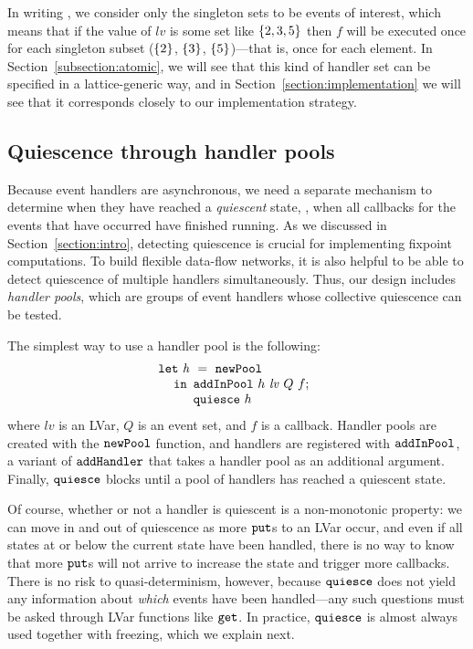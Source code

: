 In writing , we consider only the singleton sets to be events
of interest, which means that if the value of $\mathit{lv}$ is some set like
$\left\{2, 3, 5\right\}$ then $f$ will be executed once for each singleton subset
($\left\{2\right\}$, $\left\{3\right\}$, $\left\{5\right\}$)---that is, once for each element.  In
Section~\ref{subsection:atomic}, we will see that this kind of handler set can be specified in a
lattice-generic way, and in Section~\ref{section:implementation} we will see
that it corresponds closely to our implementation strategy.  


\subsection{Quiescence through handler pools}
\label{sec:quiescence-informal}

Because event handlers are asynchronous, we need a separate mechanism to
determine when they have reached a \emph{quiescent} state, \ie, when all
callbacks for the events that have occurred have finished running.  As we
discussed in Section~\ref{section:intro}, detecting quiescence is crucial for implementing
fixpoint computations.  To build flexible data-flow networks, it is also helpful
to be able to detect quiescence of multiple handlers simultaneously.  Thus, our
design includes \emph{handler pools}, which are groups of event handlers whose
collective quiescence can be tested.

The simplest way to use a handler pool is the following:
\[
\begin{array}[t]{l}
\mbox{\texttt{let}}~\mathit{h}~=~{\mbox{\texttt{newPool}}} \\
\hspace{1.2em} \mbox{\texttt{in}}
  \begin{array}[t]{l}
    {\mbox{\texttt{addInPool}}}~h~\mathit{lv}~Q~f; \\
    {\mbox{\texttt{quiesce}}}~h
  \end{array}
\end{array}
\]
where $\mathit{lv}$ is an LVar, $Q$ is an event set, and $f$ is a callback.
Handler pools are created with the ${\mbox{\texttt{newPool}}}$ function, and handlers are
registered with ${\mbox{\texttt{addInPool}}}$, a variant of ${\mbox{\texttt{addHandler}}}$ that takes a
handler pool as an additional argument.  Finally, ${\mbox{\texttt{quiesce}}}$ blocks until a pool
of handlers has reached a quiescent state.  

Of course, whether or not a handler is quiescent is a non-monotonic property: we
can move in and out of quiescence as more $\mbox{\texttt{put}}$s to an LVar occur, and even if
all states at or below the current state have been handled, there is no way to
know that more $\mbox{\texttt{put}}$s will not arrive to increase the state and trigger more
callbacks.  There is no risk to quasi-determinism, however, because ${\mbox{\texttt{quiesce}}}$
does not yield any information about \emph{which} events have been handled---any
such questions must be asked through LVar functions like $\mbox{\texttt{get}}$.  In
practice, ${\mbox{\texttt{quiesce}}}$ is almost always used together with freezing, which we
explain next.


